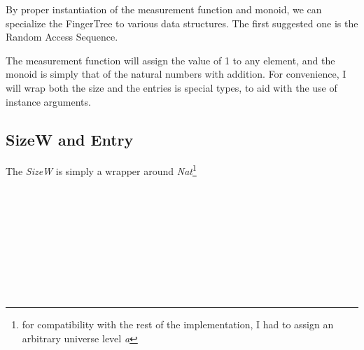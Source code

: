 \documentclass[12pt,twoside,notitlepage]{report}
\begin{document}
By proper instantiation of the measurement function and monoid, we can specialize the FingerTree to various data structures. The first suggested one is the Random Access Sequence.

The measurement function will assign the value of 1 to any element, and the monoid is simply that of the natural numbers with addition. For convenience, I will wrap both the size and the entries is special types, to aid with the use of instance arguments.

\subsection{SizeW and Entry}

The \textit{SizeW} is simply a wrapper around \textit{Nat}\footnote{for compatibility with the rest of the implementation, I had to assign an arbitrary universe level \textit{a}} 


\begin{code}
\\
\>[0]\<[2]%
\>[2]  \AgdaSymbol{\{}\AgdaSymbol{\}} \AgdaSymbol{:}   \<[26]%
\>[26]\<%
\\
\>[2]\<[4]%
\>[4] \AgdaSymbol{:}  \AgdaSymbol{(} \AgdaSymbol{:} \AgdaSymbol{)}   \AgdaSymbol{\{}\AgdaSymbol{\}}\<%
\\
\>[0]\<[2]%
\>[2] \AgdaSymbol{:}  \AgdaSymbol{\{} \AgdaSymbol{:} \AgdaSymbol{\}}   \AgdaSymbol{\{}\AgdaSymbol{\}}\<%
\\
\>[0]\<[2]%
\>[2] \AgdaSymbol{=}  \<%
\\
%
\\
\>[0]\<[2]%
\>[2] \AgdaSymbol{:} \<[9]%
\>[9] \AgdaSymbol{\{}\AgdaSymbol{\}}   \AgdaSymbol{\{}\AgdaSymbol{\}}   \AgdaSymbol{\{}\AgdaSymbol{\}}   \AgdaSymbol{\{}\AgdaSymbol{\}}\<%
\\
\>[0]\<[2]%
\>[2]     \AgdaSymbol{=}  \AgdaSymbol{(} \AgdaPrimitive{+} \AgdaSymbol{)}\<%
\\
\end{code}
\end{document}
